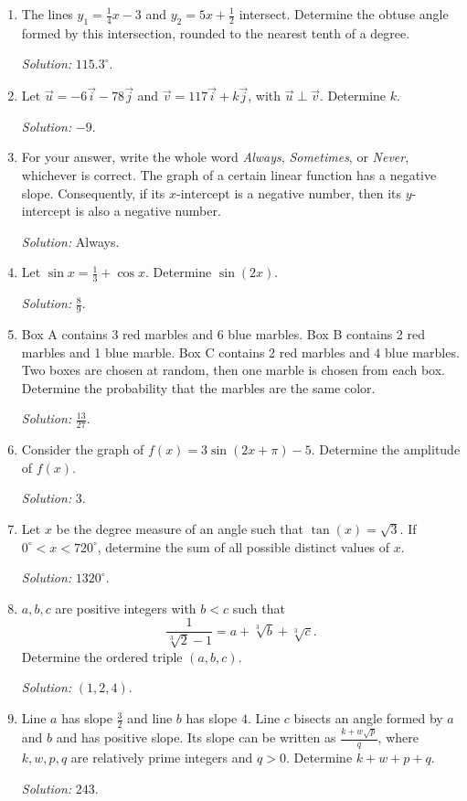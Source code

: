 \documentclass[11pt]{article}
\begin{document}
\begin{enumerate}[label=\textbf{\arabic*.}]
\item The lines $y_1=\frac14x-3$ and $y_2=5x+\frac12$ intersect. Determine the obtuse angle formed by this intersection, rounded to the nearest tenth of a degree.\par\textit{Solution: }$115.3^\circ$.

\item Let $\vec{u}=-6\vec{i}-78\vec{j}$ and $\vec{v}=117\vec{i}+k\vec{j}$, with $\vec{u}\perp\vec{v}$. Determine $k$.\par\textit{Solution: }$-9$.

\item For your answer, write the whole word \emph{Always}, \emph{Sometimes}, or \emph{Never}, whichever is correct. The graph of a certain linear function has a negative slope. Consequently, if its $x$-intercept is a negative number, then its $y$-intercept is also a negative number.\par\textit{Solution: }Always.

\item Let $\sin x=\frac13+\cos x$. Determine $\sin(2x)$.\par\textit{Solution: }$\frac89$.

\item Box A contains 3 red marbles and 6 blue marbles. Box B contains 2 red marbles and 1 blue marble. Box C contains 2 red marbles and 4 blue marbles. Two boxes are chosen at random, then one marble is chosen from each box. Determine the probability that the marbles are the same color.\par\textit{Solution: }$\frac{13}{27}$.

\item Consider the graph of $f(x)=3\sin(2x+\pi)-5$. Determine the amplitude of $f(x)$.\par\textit{Solution: }$3$.

\item Let $x$ be the degree measure of an angle such that $\tan(x)=\sqrt3$. If $0^\circ<x<720^\circ$, determine the sum of all possible distinct values of $x$.\par\textit{Solution: }$1320^\circ$.

\item $a,b,c$ are positive integers with $b<c$ such that
\[
\frac{1}{\sqrt[3]{2}-1}=a+\sqrt[3]{b}+\sqrt[3]{c}.
\]
Determine the ordered triple $(a,b,c)$.\par\textit{Solution: }$(1,2,4)$.

\item Line $a$ has slope $\frac32$ and line $b$ has slope $4$. Line $c$ bisects an angle formed by $a$ and $b$ and has positive slope. Its slope can be written as $\frac{k+w\sqrt p}{q}$, where $k,w,p,q$ are relatively prime integers and $q>0$. Determine $k+w+p+q$.\par\textit{Solution: }$243$.


\end{enumerate}
\end{document}
